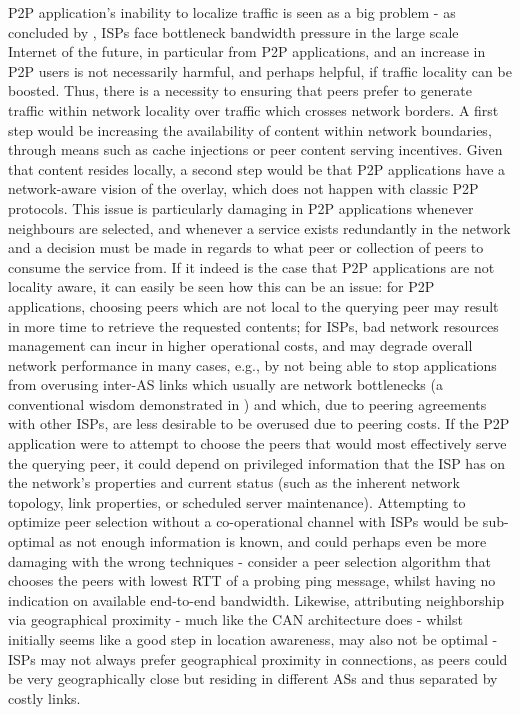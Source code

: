     P2P application's inability to localize traffic is seen as a big problem - as concluded by \cite{liao2014}, ISPs face bottleneck bandwidth pressure in the large scale Internet of the future, in particular from P2P applications, and an increase in P2P users is not necessarily harmful, and perhaps helpful, if traffic locality can be boosted.
    Thus, there is a necessity to ensuring that peers prefer to generate traffic within network locality over traffic which crosses network borders.
    A first step would be increasing the availability of content within network boundaries, through means such as cache injections or peer content serving incentives.
    Given that content resides locally, a second step would be that P2P applications have a network-aware vision of the overlay, which does not happen with classic P2P protocols.
    This issue is particularly damaging in P2P applications whenever neighbours are selected, and whenever a service exists redundantly in the network and a decision must be made in regards to what peer or collection of peers to consume the service from.
    If it indeed is the case that P2P applications are not locality aware, it can easily be seen how this can be an issue: for P2P applications, choosing peers which are not local to the querying peer may result in more time to retrieve the requested contents; for ISPs, bad network resources management can incur in higher operational costs, and may degrade overall network performance in many cases, e.g., by not being able to stop applications from overusing inter-AS links which usually are network bottlenecks (a conventional wisdom demonstrated in \cite{akella}) and which, due to peering agreements with other ISPs, are less desirable to be overused due to peering costs.
    If the P2P application were to attempt to choose the peers that would most effectively serve the querying peer, it could depend on privileged information that the ISP has on the network's properties and current status (such as the inherent network topology, link properties, or scheduled server maintenance).
    Attempting to optimize peer selection without a co-operational channel with ISPs would be sub-optimal as not enough information is known, and could perhaps even be more damaging with the wrong techniques - consider a peer selection algorithm that chooses the peers with lowest RTT of a probing ping message, whilst having no indication on available end-to-end bandwidth.
    Likewise, attributing neighborship via geographical proximity - much like the CAN architecture does - whilst initially seems like a good step in location awareness, may also not be optimal - ISPs may not always prefer geographical proximity in connections, as peers could be very geographically close but residing in different ASs and thus separated by costly links.
